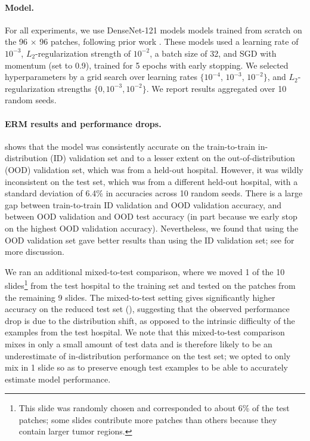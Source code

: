 \paragraph{Model.}
For all experiments, we use DenseNet-121 models \citep{huang2017densely} models trained from scratch on the 96 $\times$ 96 patches, following prior work \citep{veeling2018rotation}. These models used a learning rate of $10^{-3}$, $L_2$-regularization strength of $10^{-2}$, a batch size of 32, and SGD with momentum (set to 0.9), trained for 5 epochs with early stopping.
We selected hyperparameters by a grid search over learning rates $\{10^{-4}$, $10^{-3}$, $10^{-2}\}$, and $L_2$-regularization strengths $\{0, 10^{-3}, 10^{-2}\} $.
We report results aggregated over 10 random seeds.

\paragraph{ERM results and performance drops.}
 shows that the model was consistently accurate on the train-to-train in-distribution (ID) validation set and to a lesser extent on the out-of-distribution (OOD) validation set, which was from a held-out hospital.
However, it was wildly inconsistent on the test set, which was from a different held-out hospital,
with a standard deviation of 6.4\% in accuracies across 10 random seeds.
There is a large gap between train-to-train ID validation and OOD validation accuracy, and between OOD validation and OOD test accuracy (in part because we early stop on the highest OOD validation accuracy).
Nevertheless, we found that using the OOD validation set gave better results than using the ID validation set; see  for more discussion.

We ran an additional mixed-to-test comparison, where we moved 1 of the 10 slides\footnote{This slide was randomly chosen and corresponded to about 6\% of the test patches; some slides contribute more patches than others because they contain larger tumor regions.} from the test hospital to the training set and tested on the patches from the remaining 9 slides.
The mixed-to-test setting gives significantly higher accuracy on the reduced test set (), suggesting that the observed performance drop is due to the distribution shift, as opposed to the intrinsic difficulty of the examples from the test hospital.
We note that this mixed-to-test comparison mixes in only a small amount of test data and is therefore likely to be an underestimate of in-distribution performance on the test set; we opted to only mix in 1 slide so as to preserve enough test examples to be able to accurately estimate model performance.

